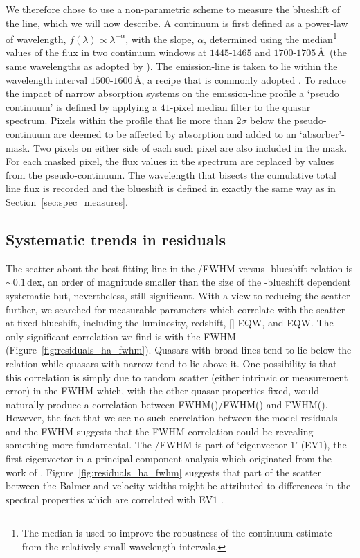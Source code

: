 We therefore chose to use a non-parametric scheme to measure the blueshift of the  line, which we will now describe. 
A continuum is first defined as a power-law of wavelength, $f(\lambda) \propto \lambda^{-\alpha}$, with the slope, $\alpha$, determined using the median\footnote{The median is used to improve the robustness of the continuum estimate from the relatively small wavelength intervals.} values of the flux in two continuum windows at $1445$-$1465$ and $1700$-$1705$\,\AA\, (the same wavelengths as adopted by \citealt{shen11}). 
The  emission-line is taken to lie within the wavelength interval $1500$-$1600$\,\AA, a recipe that is commonly adopted \citep[e.g.][]{shen11, denney13}. 
To reduce the impact of narrow absorption systems on the emission-line profile a `pseudo continuum' is defined by applying a $41$-pixel median filter to the quasar spectrum.
Pixels within the  profile that lie more than $2\sigma$ below the pseudo-continuum are deemed to be affected by absorption and added to an `absorber'-mask. 
Two pixels on either side of each such pixel are also included in the mask. 
For each masked pixel, the flux values in the spectrum are replaced by values from the pseudo-continuum. 
The wavelength that bisects the cumulative total line flux is recorded and the blueshift is defined in exactly the same way as in Section~\ref{sec:spec_measures}. 

\subsection{Systematic trends in residuals}
\label{sec:ch3-residuals}

The scatter about the best-fitting line in the /\ha FWHM versus -blueshift relation is $\sim0.1$\,dex, an order of magnitude smaller than the size of the -blueshift dependent systematic but, nevertheless, still significant.
With a view to reducing the scatter further, we searched for measurable parameters which correlate with the scatter at fixed  blueshift, including the luminosity, redshift, [] EQW, and  EQW.
The only significant correlation we find is with the \ha FWHM (Figure~\ref{fig:residuals_ha_fwhm}).
Quasars with broad \ha lines tend to lie below the relation while quasars with narrow \ha tend to lie above it.
One possibility is that this correlation is simply due to random scatter (either intrinsic or measurement error) in the \ha FWHM which, with the other quasar properties fixed, would naturally produce a correlation between FWHM()/FWHM(\hans) and FWHM(\hans).
However, the fact that we see no such correlation between the model residuals and the  FWHM suggests that the \ha FWHM correlation could be revealing something more fundamental. 
The \hans/\hb FWHM is part of `eigenvector $1$' (EV$1$), the first eigenvector in a principal component analysis which originated from the work of \citet{boroson92}.    
Figure~\ref{fig:residuals_ha_fwhm} suggests that part of the scatter between the Balmer and  velocity widths might be attributed to differences in the spectral properties which are correlated with EV$1$ \citep{marziani13}. 

